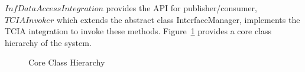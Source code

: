 \documentclass[conference]{IEEEtran}
\begin{document}
$InfDataAccessIntegration$ provides the API for publisher/consumer, $TCIAInvoker$ which extends the abstract class InterfaceManager, implements the TCIA integration to invoke these methods. Figure~\ref{fig:class} provides a core class hierarchy of the system.
\begin{figure}[ht]
\begin{center}
\end{center}
 \caption{Core Class Hierarchy}
 \label{fig:class}
\end{figure}
\end{document}
